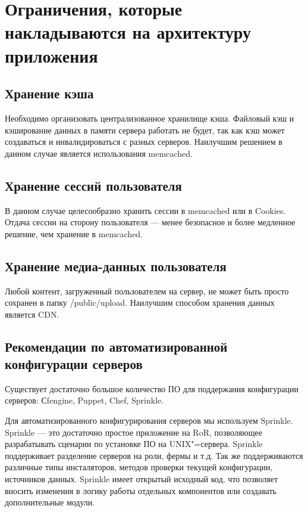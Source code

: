 \documentclass[10pt, a5paper]{article}
\begin{document}
\section*{Ограничения, которые накладываются на архитектуру приложения}

\subsection*{Хранение кэша}
Необходимо организовать централизованное хранилище кэша. Файловый кэш и кэширование данных в памяти сервера работать не будет, так как кэш может создаваться и инвалидироваться с разных серверов. Наилучшим решением в данном случае является использования memcached. 

\subsection*{Хранение сессий пользователя}
В данном случае целесообразно хранить сессии в memcached или в Cookies. Отдача сессии на сторону пользователя --- менее безопасное и более медленное решение, чем хранение в memcached. 

\subsection*{Хранение медиа-данных пользователя}
Любой контент, загруженный пользователем на сервер, не может быть просто  сохранен в папку /public/upload. Наилучшим способом хранения данных является CDN. 

\subsection*{Рекомендации по автоматизированной конфигурации серверов}
Существует достаточно большое количество ПО для поддержания конфигурации серверов: Сfengine, Puppet, Chef, Sprinkle. 

Для автоматизированного конфигурирования серверов мы используем Sprinkle. Sprinkle --- это достаточно простое приложение на RoR, позволяющее разрабатывать сценарии по установке ПО на UNIX"=сервера.  Sprinkle поддерживает разделение серверов на роли, фермы и т.д. Так же поддерживаются различные типы инсталяторов, методов проверки текущей конфигурации, источников данных. Sprinkle имеет открытый исходный код, что позволяет вносить изменения в логику работы отдельных компонентов или создавать дополнительные модули. 
\end{document}
